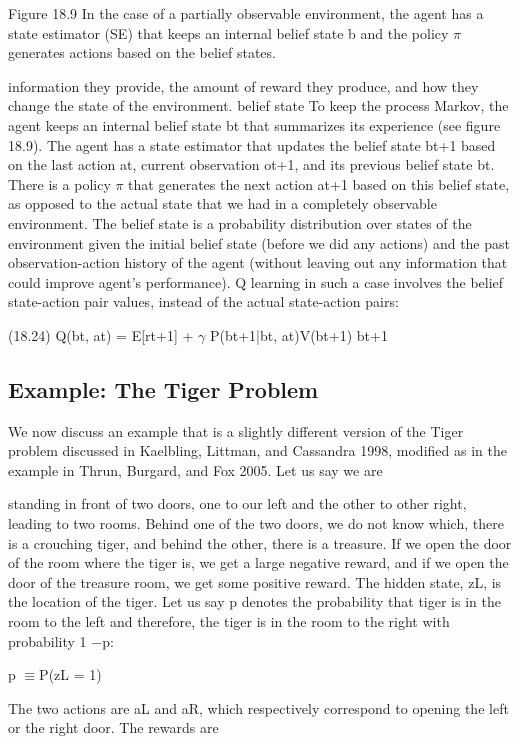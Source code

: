 Figure 18.9 In the case of a partially observable environment, the agent has a state estimator (SE) that keeps an internal belief state b and the policy $\pi$ generates actions based on the belief states.

information they provide, the amount of reward they produce, and how they change the state of the environment. belief state To keep the process Markov, the agent keeps an internal belief state bt that summarizes its experience (see figure 18.9). The agent has a state estimator that updates the belief state bt+1 based on the last action at, current observation ot+1, and its previous belief state bt. There is a policy $\pi$ that generates the next action at+1 based on this belief state, as opposed to the actual state that we had in a completely observable environment. The belief state is a probability distribution over states of the environment given the initial belief state (before we did any actions) and the past observation-action history of the agent (without leaving out any information that could improve agent’s performance). Q learning in such a case involves the belief state-action pair values, instead of the actual state-action pairs:

(18.24) Q(bt, at) = E[rt+1] + $\gamma$ P(bt+1|bt, at)V(bt+1) bt+1

\subsection{Example: The Tiger Problem}

We now discuss an example that is a slightly different version of the Tiger problem discussed in Kaelbling, Littman, and Cassandra 1998, modified as in the example in Thrun, Burgard, and Fox 2005. Let us say we are

standing in front of two doors, one to our left and the other to other right, leading to two rooms. Behind one of the two doors, we do not know which, there is a crouching tiger, and behind the other, there is a treasure. If we open the door of the room where the tiger is, we get a large negative reward, and if we open the door of the treasure room, we get some positive reward. The hidden state, zL, is the location of the tiger. Let us say p denotes the probability that tiger is in the room to the left and therefore, the tiger is in the room to the right with probability 1 $-$p:

p $\equiv$P(zL = 1)

The two actions are aL and aR, which respectively correspond to opening the left or the right door. The rewards are

